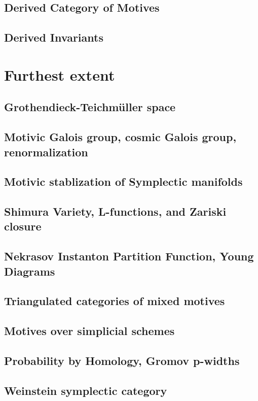 \documentclass{article}
\theoremstyle{definition}
\begin{document}
    \subsection{Derived Category of Motives}
    \subsection{Derived Invariants}
    

\section{Furthest extent}
    \subsection{Grothendieck-Teichmüller space}
    \subsection{Motivic Galois group, cosmic Galois group, renormalization}
    \subsection{Motivic stablization of Symplectic manifolds}
    \subsection{Shimura Variety, L-functions, and Zariski closure}
    \subsection{Nekrasov Instanton Partition Function, Young Diagrams}
    \subsection{Triangulated categories of mixed motives}
    \subsection{Motives over simplicial schemes}
    \subsection{Probability by Homology, Gromov p-widths}
    \subsection{Weinstein symplectic category}
\end{document}
